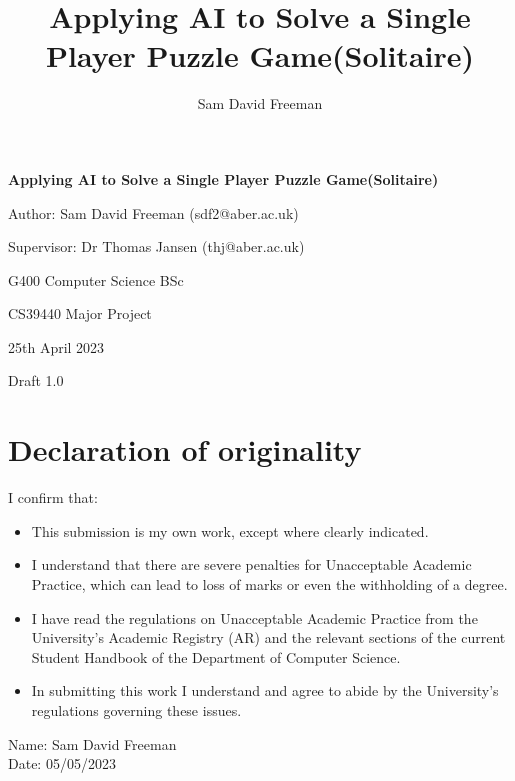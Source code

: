 \documentclass[a4paper,11pt]{article}
\title{Applying AI to Solve a Single Player Puzzle Game(Solitaire)}
\author{Sam David Freeman}
\begin{document}
\begin{center}
	\textbf{{\Large Applying AI to Solve a Single Player Puzzle Game(Solitaire)}}
\end{center}
\begin{center}
	Author: Sam David Freeman (sdf2@aber.ac.uk)
\end{center}
\begin{center}
	Supervisor: Dr Thomas Jansen (thj@aber.ac.uk)
\end{center} 
\begin{center}
	G400 Computer Science BSc
\end{center}
\begin{center}
	CS39440 Major Project
\end{center}
\begin{center}
	25th April 2023
\end{center}
\begin{center}
	Draft 1.0
\end{center}
\newpage




\section*{\centering Declaration of originality}

I confirm that:

\begin{itemize}
	\item{This submission is my own work, except where 
		clearly indicated.}
	
	\item{I understand that there are severe penalties for Unacceptable Academic Practice, which can lead to loss of marks or even the withholding of a degree.}
	
	\item{I have read the regulations on Unacceptable Academic Practice from the University's Academic Registry (AR) and the relevant sections of the current Student Handbook of the Department of Computer Science.}
	
	\item{In submitting this work I understand and agree to abide by the University's regulations governing these issues.}
\end{itemize}

\vspace{2em}
Name: Sam David Freeman  \\

\vspace{1em}
Date: 05/05/2023 \\
\newpage
\end{document}
